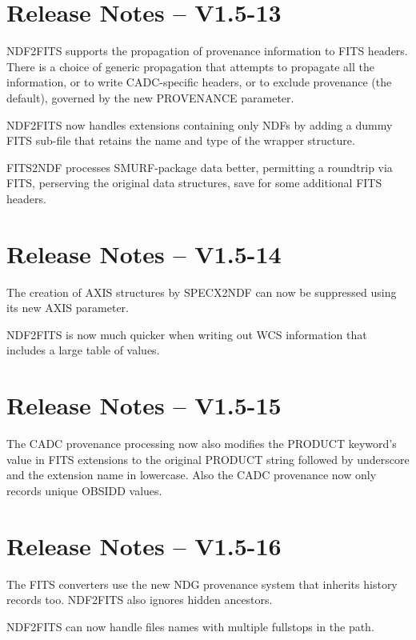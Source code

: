 \documentclass[twoside,11pt]{article}
\newcommand{\htmlref}[2]{#1}
\begin{document}
\section{Release Notes -- V1.5-13}

\htmlref{NDF2FITS}{NDF2FITS} supports the propagation of provenance
information to FITS headers.  There is a choice of generic propagation
that attempts to propagate all the information, or to write
CADC-specific headers, or to exclude provenance (the default),
governed by the new PROVENANCE parameter.

NDF2FITS now handles extensions containing only NDFs by adding a dummy
FITS sub-file that retains the name and type of the wrapper
structure.
 
\htmlref{FITS2NDF}{FITS2NDF} processes SMURF-package data
better, permitting a roundtrip via FITS, perserving the original
data structures, save for some additional FITS headers.

\section{Release Notes -- V1.5-14}

The creation of AXIS structures by \htmlref{SPECX2NDF}{SPECX2NDF} can 
now be suppressed using its new AXIS parameter.

\htmlref{NDF2FITS}{NDF2FITS} is now much quicker when writing out WCS
information that includes a large table of values.

\section{Release Notes -- V1.5-15}

The CADC provenance processing now also modifies the PRODUCT keyword's
value in FITS extensions to the original PRODUCT string followed by 
underscore and the extension name in lowercase.  Also the CADC 
provenance now only records unique OBSIDD values.

\section{Release Notes -- V1.5-16}

The FITS converters use the new NDG provenance system that inherits
history records too.  \htmlref{NDF2FITS}{NDF2FITS} also ignores hidden
ancestors.

NDF2FITS can now handle files names with multiple fullstops in the 
path.
\end{document}
